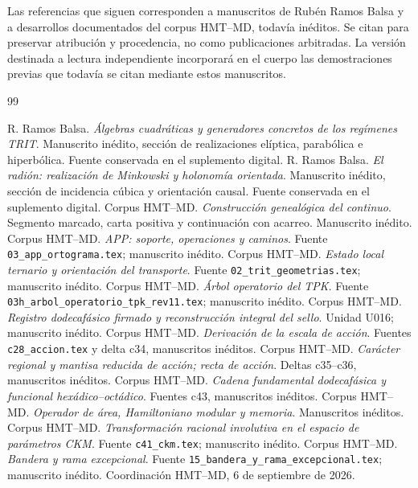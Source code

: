 \documentclass[11pt,a4paper]{article}
\numberwithin{equation}{section}
\theoremstyle{definition}
\begin{document}
Las referencias que siguen corresponden a manuscritos de Rubén Ramos
Balsa y a desarrollos documentados del corpus HMT--MD, todavía inéditos.
Se citan para preservar atribución y procedencia, no como publicaciones
arbitradas. La versión destinada a lectura independiente incorporará
en el cuerpo las demostraciones previas que todavía se citan mediante
estos manuscritos.
\clearpage
\begin{thebibliography}{99}
\raggedright
\small
\setlength{\itemsep}{4pt}
\setlength{\parsep}{0pt}
\setlength{\parskip}{0pt}
 R. Ramos Balsa. \emph{Álgebras cuadráticas y generadores concretos de los regímenes TRIT}.
Manuscrito inédito, sección de realizaciones elíptica, parabólica e hiperbólica.
Fuente conservada en el suplemento digital.
 R. Ramos Balsa. \emph{El radión: realización de Minkowski y holonomía orientada}.
Manuscrito inédito, sección de incidencia cúbica y orientación causal.
Fuente conservada en el suplemento digital.
 Corpus HMT--MD. \emph{Construcción genealógica del continuo}.
Segmento marcado, carta positiva y continuación con acarreo. Manuscrito inédito.
 Corpus HMT--MD. \emph{APP: soporte, operaciones y caminos}.
Fuente \texttt{03\_app\_ortograma.tex}; manuscrito inédito.
 Corpus HMT--MD. \emph{Estado local ternario y orientación del transporte}.
Fuente \texttt{02\_trit\_geometrias.tex}; manuscrito inédito.
 Corpus HMT--MD. \emph{Árbol operatorio del TPK}.
Fuente \texttt{03h\_arbol\_operatorio\_tpk\_rev11.tex}; manuscrito inédito.
 Corpus HMT--MD. \emph{Registro dodecafásico firmado y reconstrucción integral del sello}.
Unidad U016; manuscrito inédito.
 Corpus HMT--MD. \emph{Derivación de la escala de acción}.
Fuentes \texttt{c28\_accion.tex} y delta c34, manuscritos inéditos.
 Corpus HMT--MD. \emph{Carácter regional y mantisa reducida de acción; recta de acción}.
Deltas c35--c36, manuscritos inéditos.
 Corpus HMT--MD. \emph{Cadena fundamental dodecafásica y funcional hexádico--octádico}.
Fuentes c43, manuscritos inéditos.
 Corpus HMT--MD. \emph{Operador de área, Hamiltoniano modular y memoria}.
Manuscritos inéditos.
 Corpus HMT--MD. \emph{Transformación racional involutiva en el espacio de parámetros CKM}.
Fuente \texttt{c41\_ckm.tex}; manuscrito inédito.
 Corpus HMT--MD. \emph{Bandera y rama excepcional}.
Fuente \texttt{15\_bandera\_y\_rama\_excepcional.tex}; manuscrito inédito.
 Coordinación HMT--MD, 6 de septiembre de 2026.

\end{thebibliography}
\end{document}

